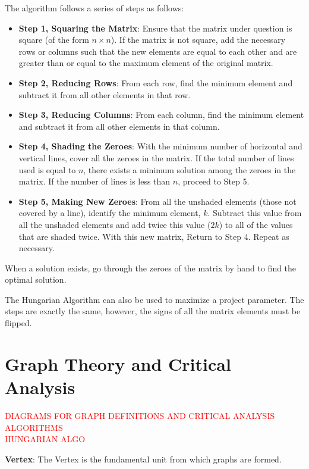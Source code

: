 \begin{defn} \label{mod1:defn:HungAlgStep4}
	The algorithm follows a series of steps as follows:
	\begin{itemize}
		\item \textbf{Step 1, Squaring the Matrix}: Ensure that the matrix under question is square (of the form $n\times n$). If the matrix is not square, add the necessary rows or columns such that the new elements are equal to each other and are greater than or equal to the maximum element of the original matrix.
		\item \textbf{Step 2, Reducing Rows}: From each row, find the minimum element and subtract it from all other elements in that row.
		\item \textbf{Step 3, Reducing Columns}: From each column, find the minimum element and subtract it from all other elements in that column.
		\item \textbf{Step 4, Shading the Zeroes}: With the minimum number of horizontal and vertical lines, cover all the zeroes in the matrix. If the total number of lines used is equal to $n$, there exists a minimum solution among the zeroes in the matrix. If the number of lines is less than $n$, proceed to Step 5.
		\item \textbf{Step 5, Making New Zeroes}: From all the unshaded elements (those not covered by a line), identify the minimum element, $k$. Subtract this value from all the unshaded elements and add twice this value ($2k$) to all of the values that are shaded twice. With this new matrix, Return to Step 4. Repeat as necessary.
	\end{itemize}
When a solution exists, go through the zeroes of the matrix by hand to find the optimal solution.
\end{defn}

\begin{note}
	The Hungarian Algorithm can also be used to maximize a project parameter. The steps are exactly the same, however, the signs of all the matrix elements must be flipped.	
\end{note}



\section{Graph Theory and Critical Analysis} \label{Module1:GraphTheoryCriticalAnalysis}

\textcolor{red} {DIAGRAMS FOR GRAPH DEFINITIONS  AND CRITICAL ANALYSIS ALGORITHMS}\\
\textcolor{red}{HUNGARIAN ALGO}
\begin{defn}\label{mod1:defn:Vertex}
   \textbf{Vertex}: The Vertex is the fundamental unit from which graphs are formed.
\end{defn}

